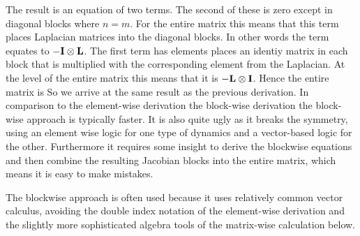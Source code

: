The result is an equation of two terms. The second of these is zero except in diagonal blocks where $n=m$. For the entire matrix this means that this term places Laplacian matrices into the diagonal blocks. In other words the term equates to $-{\bf I}\otimes {\bf L}$. The first term has elements places an identiy matrix in each block that is multiplied with the corresponding element from the Laplacian. At the level of the entire matrix this means that it is $-{\bf L} \otimes {\bf I}$. Hence the entire matrix is 
So we arrive at the same result as the previous derivation. In comparison to the element-wise derivation the block-wise derivation the block-wise approach is typically faster. It is also quite ugly as it breaks the symmetry, using an element wise logic for one type of dynamics and a vector-based logic for the other. Furthermore it requires some insight to derive the blockwise equations and then combine the resulting Jacobian blocks into the entire matrix, which means it is easy to make mistakes. 

The blockwise approach is often used because it uses relatively common vector calculus, avoiding the double index notation of the element-wise derivation and the slightly more sophisticated algebra tools of the matrix-wise calculation below.

